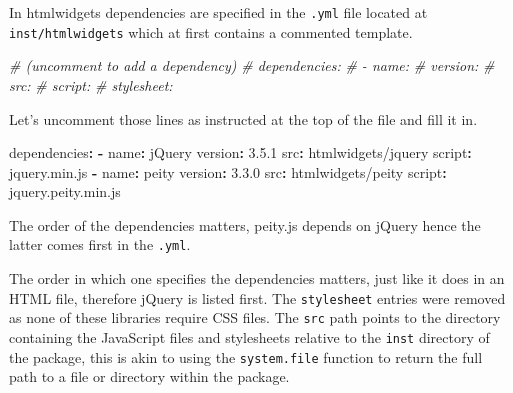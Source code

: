 \documentclass[
]{krantz}
\makeatletter
\newenvironment{Shaded}{\begin{snugshade}}{\end{snugshade}}
\newcommand{\AttributeTok}[1]{\textcolor[rgb]{0.61,0.61,0.61}{#1}}
\newcommand{\CommentTok}[1]{\textcolor[rgb]{0.37,0.37,0.37}{\textit{#1}}}
\newcommand{\FloatTok}[1]{\textcolor[rgb]{0.06,0.06,0.06}{#1}}
\newcommand{\FunctionTok}[1]{\textcolor[rgb]{0,0,0}{#1}}
\newcommand{\KeywordTok}[1]{\textcolor[rgb]{0.27,0.27,0.27}{\textbf{#1}}}
\newenvironment{kframe}{%
\medskip{}
\setlength{\fboxsep}{.8em}
 \def\at@end@of@kframe{}%
 \ifinner\ifhmode%
  \def\at@end@of@kframe{\end{minipage}}%
  \begin{minipage}{\columnwidth}%
 \fi\fi%
 \def\FrameCommand##1{\hskip\@totalleftmargin \hskip-\fboxsep
 \colorbox{shadecolor}{##1}\hskip-\fboxsep
     \hskip-\linewidth \hskip-\@totalleftmargin \hskip\columnwidth}%
 \MakeFramed {\advance\hsize-\width
   \@totalleftmargin\z@ \linewidth\hsize
   \@setminipage}}%
 {\par\unskip\endMakeFramed%
 \at@end@of@kframe}
\renewenvironment{Shaded}{\begin{kframe}}{\end{kframe}}
\newenvironment{rmdblock}[1]
  {
  \begin{itemize}
  \renewcommand{\labelitemi}{
    \raisebox{-.7\height}[0pt][0pt]{
      {\setkeys{Gin}{width=3em,keepaspectratio}\texttt{[image: images/\#1]}}
    }
  }
  \setlength{\fboxsep}{1em}
  \begin{kframe}
  \item
  }
  {
  \end{kframe}
  \end{itemize}
  }
\newenvironment{rmdnote}
  {\begin{rmdblock}{note}}
  {\end{rmdblock}}
\makeatother
\begin{document}
In htmlwidgets dependencies are specified in the \texttt{.yml} file located at \texttt{inst/htmlwidgets} which at first contains a commented template.

\begin{Shaded}
\begin{Highlighting}[]
\CommentTok{\# (uncomment to add a dependency)}
\CommentTok{\# dependencies:}
\CommentTok{\#  {-} name:}
\CommentTok{\#    version:}
\CommentTok{\#    src:}
\CommentTok{\#    script:}
\CommentTok{\#    stylesheet:}
\end{Highlighting}
\end{Shaded}

Let's uncomment those lines as instructed at the top of the file and fill it in.

\begin{Shaded}
\begin{Highlighting}[]
\FunctionTok{dependencies}\KeywordTok{:}
\AttributeTok{  }\KeywordTok{{-}}\AttributeTok{ }\FunctionTok{name}\KeywordTok{:}\AttributeTok{ jQuery}
\AttributeTok{    }\FunctionTok{version}\KeywordTok{:}\AttributeTok{ }\FloatTok{3.5.1}
\AttributeTok{    }\FunctionTok{src}\KeywordTok{:}\AttributeTok{ htmlwidgets/jquery}
\AttributeTok{    }\FunctionTok{script}\KeywordTok{:}\AttributeTok{ jquery.min.js}
\AttributeTok{  }\KeywordTok{{-}}\AttributeTok{ }\FunctionTok{name}\KeywordTok{:}\AttributeTok{ peity}
\AttributeTok{    }\FunctionTok{version}\KeywordTok{:}\AttributeTok{ }\FloatTok{3.3.0}
\AttributeTok{    }\FunctionTok{src}\KeywordTok{:}\AttributeTok{ htmlwidgets/peity}
\AttributeTok{    }\FunctionTok{script}\KeywordTok{:}\AttributeTok{ jquery.peity.min.js}
\end{Highlighting}
\end{Shaded}

\begin{rmdnote}
The order of the dependencies matters, peity.js depends on jQuery hence
the latter comes first in the \texttt{.yml}.
\end{rmdnote}

The order in which one specifies the dependencies matters, just like it does in an HTML file, therefore jQuery is listed first. The \texttt{stylesheet} entries were removed as none of these libraries require CSS files. The \texttt{src} path points to the directory containing the JavaScript files and stylesheets relative to the \texttt{inst} directory of the package, this is akin to using the \texttt{system.file} function to return the full path to a file or directory within the package.
\end{document}
